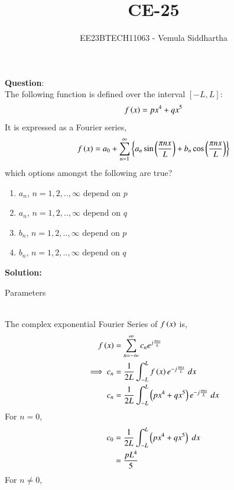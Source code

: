 \documentclass[journal,12pt,twocolumn]{IEEEtran}
\theoremstyle{remark}
\begin{document}

\vspace{3cm}

\title{CE-25}
\author{EE23BTECH11063 - Vemula Siddhartha}
\maketitle
\newpage
\bigskip

\renewcommand{\thefigure}{\theenumi}
\renewcommand{\thetable}{\theenumi}
\textbf{Question}:\\
The following function is defined over the interval $[-L,L]$:
    $$f\left(x\right)=px^4+qx^5$$
It is expressed as a Fourier series,
    $$f\left(x\right)=a_0+\sum_{n=1}^{\infty}\left\{a_n\sin\left(\frac{\pi n x}{L}\right)+b_n\cos\left(\frac{\pi n x}{L}\right)\right\}$$
which options amongst the following are true?
\begin{enumerate}[label=(\alph*)]
    \item $a_n$, $n=1,2,..,\infty$ depend on $p$
    \item $a_n$, $n=1,2,..,\infty$ depend on $q$
    \item $b_n$, $n=1,2,..,\infty$ depend on $p$
    \item $b_n$, $n=1,2,..,\infty$ depend on $q$
\end{enumerate}
\textbf{Solution:}
\begin{table}[h!]    
    \centering
    
    \caption{Parameters}
    \label{tab:CE:25}
\end{table}\\
The complex exponential Fourier Series of $f\left(x\right)$ is,
\begin{align}
    f\left(x\right)&=\sum_{n=-\infty}^{\infty}c_ne^{j\frac{\pi nx}{L}}\\
    \implies c_n&=\frac{1}{2L}\int_{-L}^{L}f\left(x\right)e^{-j\frac{\pi n x}{L}}\;dx\\
    c_n&=\frac{1}{2L}\int_{-L}^{L}\left(px^4+qx^5\right)e^{-j\frac{\pi n x}{L}}\;dx
\end{align}
For $n=0$, 
\begin{align}
    c_0&=\frac{1}{2L}\int_{-L}^{L}\left(px^4+qx^5\right)\;dx\\
    &=\frac{pL^4}{5}
\end{align}
For $n\neq0$,
\end{document}
